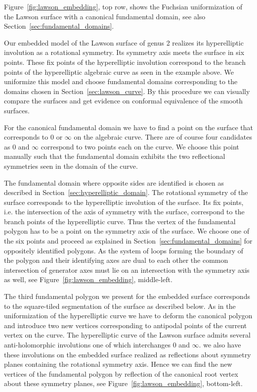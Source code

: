 \documentclass[Thesis]{subfiles}
\begin{document}
Figure~\ref{fig:lawson_embedding}, top row, shows the Fuchsian uniformization of the Lawson surface with a canonical fundamental domain, see also Section~\ref{sec:fundamental_domains}.

Our embedded model of the Lawson surface of genus 2 realizes its hyperelliptic involution as a rotational symmetry.
Its symmetry axis meets the surface in six points. These fix points of the hyperelliptic involution correspond to the branch points of the hyperelliptic algebraic curve as seen in the example above. We uniformize this model and choose fundamental domains corresponding to the domains chosen in Section~\ref{sec:lawson_curve}. By this procedure we can visually compare the surfaces and get evidence on conformal equivalence of the smooth surfaces.

For the canonical fundamental domain we have to find a point on the surface that corresponds to $0$ or $\infty$ on the algebraic curve. There are of course four candidates as $0$ and $\infty$ correspond to two points each on the curve. We choose this point manually such that the fundamental domain exhibits the two reflectional symmetries seen in the domain of the curve.

The fundamental domain where opposite sides are identified is chosen as described in Section~\ref{sec:hyperelliptic_domain}. The rotational symmetry of the surface corresponds to the hyperelliptic involution of the surface. Its fix points, i.e. the intersection of the axis of symmetry with the surface, correspond to the branch points of the hyperelliptic curve. Thus the vertex of the fundamental polygon has to be a point on the symmetry axis of the surface. We choose one of the six points and proceed as explained in Section~\ref{sec:fundamental_domains} for oppositely identified polygons. As the system of loops forming the boundary of the polygon and their identifying axes are dual to each other the common intersection of generator axes must lie on an intersection with the symmetry axis as well, see Figure~\ref{fig:lawson_embedding}, middle-left.

The third fundamental polygon we present for the embedded surface corresponds to the square-tiled segmentation of the surface as described below. As in the uniformization of the hyperelliptic curve we have to deform the canonical polygon and introduce two new vertices corresponding to antipodal points of the current vertex on the curve. The hyperelliptic curve of the Lawson surface admits several anti-holomorphic involutions one of which interchanges $0$ and $\infty$. we also have these involutions on the embedded surface realized as reflections about symmetry planes containing the rotational symmetry axis. Hence we can find the new vertices of the fundamental polygon by reflection of the canonical root vertex about these symmetry planes, see Figure~\ref{fig:lawson_embedding}, bottom-left.
\end{document}
